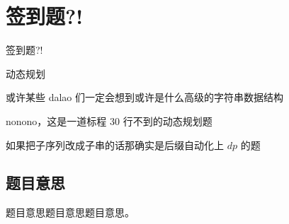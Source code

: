 \def\sectionName{签到题?!}
\section{\sectionName}



\begin{frame}

\isBeamerMode\relax
    {\Huge \sectionName}\par
\fi




动态规划

或许某些 dalao 们一定会想到或许是什么高级的字符串数据结构

nonono，这是一道标程 30 行不到的动态规划题

如果把子序列改成子串的话那确实是后缀自动化上 $dp$ 的题



\end{frame}

\subsection{题目意思}
\begin{frame} %
题目意思题目意思题目意思。
\end{frame}



